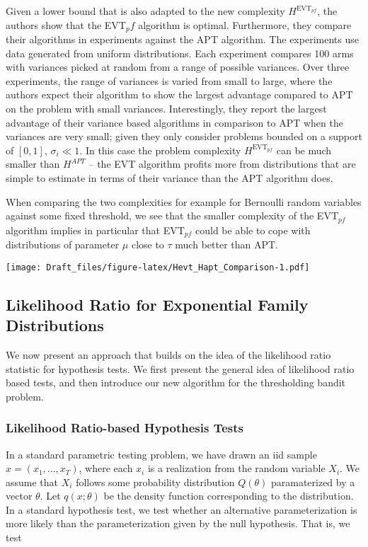 \documentclass[12pt,]{article}
\begin{document}
Given a lower bound that is also adapted to the new complexity
\(H^{\text{EVT}_{pf}}\), the authors show that the EVT\(_pf\) algorithm
is optimal. Furthermore, they compare their algorithms in experiments
against the APT algorithm. The experiments use data generated from
uniform distributions. Each experiment compares 100 arms with variances
picked at random from a range of possible variances. Over three
experiments, the range of variances is varied from small to large, where
the authors expect their algorithm to show the largest advantage
compared to APT on the problem with small variances. Interestingly, they
report the largest advantage of their variance based algorithms in
comparison to APT when the variances are very small; given they only
consider problems bounded on a support of \([0,1]\), \(\sigma_i \ll 1\).
In this case the problem complexity \(H^{\text{EVT}_{pf}}\) can be much
smaller than \(H^{APT}\) -- the EVT algorithm profits more from
distributions that are simple to estimate in terms of their variance
than the APT algorithm does.

When comparing the two complexities for example for Bernoulli random
variables against some fixed threshold, we see that the smaller
complexity of the EVT\(_{pf}\) algorithm implies in particular that
EVT\(_{pf}\) could be able to cope with distributions of parameter
\(\mu\) close to \(\tau\) much better than APT.

\texttt{[image: Draft\_files/figure-latex/Hevt\_Hapt\_Comparison-1.pdf]}

\subsection{Likelihood Ratio for Exponential Family
Distributions}\label{likelihood-ratio-for-exponential-family-distributions}

We now present an approach that builds on the idea of the likelihood
ratio statistic for hypothesis tests. We first present the general idea
of likelihood ratio based tests, and then introduce our new algorithm
for the thresholding bandit problem.

\subsubsection{Likelihood Ratio-based Hypothesis
Tests}\label{likelihood-ratio-based-hypothesis-tests}

In a standard parametric testing problem, we have drawn an iid sample
\(x = (x_1, ..., x_T)\), where each \(x_i\) is a realization from the
random variable \(X_i\). We assume that \(X_i\) follows some probability
distribution \(Q(\theta)\) paramaterized by a vector \(\theta\). Let
\(q(x;\theta)\) be the density function corresponding to the
distribution. In a standard hypothesis test, we test whether an
alternative parameterization is more likely than the parameterization
given by the null hypothesis. That is, we test
\end{document}
